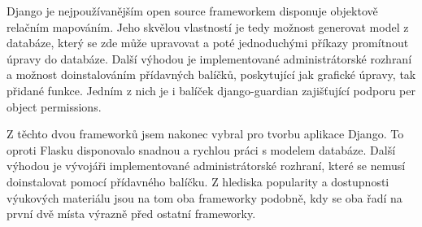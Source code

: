 Django je nejpoužívanějším open source frameworkem disponuje objektově relačním mapováním. Jeho skvělou vlastností je tedy možnost generovat model z databáze, který se zde může upravovat a poté jednoduchými příkazy promítnout úpravy do databáze. Další výhodou je implementované administrátorské rozhraní a možnost doinstalováním přídavných balíčků, poskytující jak grafické úpravy, tak přidané funkce. Jedním z nich je i balíček django-guardian zajišťující podporu per object permissions.

Z těchto dvou frameworků jsem nakonec vybral pro tvorbu aplikace Django. To oproti Flasku disponovalo snadnou a rychlou práci s modelem databáze. Další výhodou je vývojáři implementované administrátorské rozhraní, které se nemusí doinstalovat pomocí přídavného balíčku. Z hlediska popularity a dostupnosti výukových materiálu jsou na tom oba frameworky podobně, kdy se oba řadí na první dvě místa výrazně před ostatní frameworky. 

\textbf{}
\textit{}



















